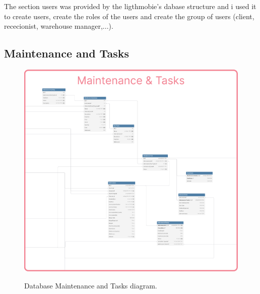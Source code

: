 The section users was provided by the ligthmobie's dabase structure and i used it to create users, create the roles of the users and create the group of users (client, rececionist, warehouse manager,...).



\subsection{Maintenance and Tasks} 


\begin{figure}[h]
  \caption{Database Maintenance and Tasks diagram.}
  \centering
  \includegraphics[width=\textwidth]{figs/dbDiagrams/Maintenance_and_Tasks}
  \label{fig:figure2}
\end{figure}


